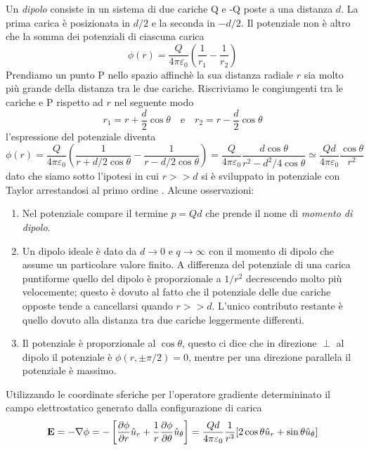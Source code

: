 Un \textit{dipolo} consiste in un sistema di due cariche Q e -Q poste a una distanza $d$. La prima carica \`e posizionata in $d/2$ e la seconda in $-d/2$. Il potenziale non \`e altro che la somma dei potenziali di ciascuna carica
\begin{equation*}
	\phi(r) = \frac{Q}{4 \pi \varepsilon_0} \left( \frac{1}{r_1} - \frac{1}{r_2}\right)
\end{equation*}
Prendiamo un punto P nello spazio  affinch\`e la sua distanza radiale $r$ sia molto pi\`u grande della distanza tra le due cariche. Riscriviamo le congiungenti tra le cariche e P rispetto ad $r$ nel seguente modo
\begin{equation*}
	r_1 = r + \frac{d}{2}\cos\theta \quad \text{e} \quad
	r_2 = r - \frac{d}{2}\cos \theta 
\end{equation*} 
l'espressione del potenziale diventa 
\begin{equation*}
	\phi(r) = \frac{Q}{4 \pi \varepsilon_0} \left(\frac{1}{r + d/2 \cos\theta } - \frac{1}{r - d/2 \cos\theta} \right) = \frac{Q}{4 \pi \varepsilon_0} \frac{d \cos \theta }{r^2 - d^2/4\cos \theta}\simeq \frac{Qd}{4 \pi \varepsilon_0} \frac{ \cos \theta }{r^2}
\end{equation*}
dato che siamo sotto l'ipotesi in cui $r >> d$ si \`e sviluppato in potenziale con Taylor arrestandosi al primo ordine .
Alcune osservazioni:
\begin{enumerate}

\item Nel potenziale compare il termine $ p=Qd$ che prende il nome di \textit{momento di dipolo}.

\item Un dipolo ideale \`e dato da $d \to 0$ e $q \to \infty $ con il momento di dipolo che assume un particolare valore finito. A differenza del potenziale di una carica puntiforme quello del dipolo \`e proporzionale a $1/r^2$ decrescendo molto pi\`u velocemente; questo \`e dovuto al fatto che il potenziale delle due cariche opposte tende a cancellarsi quando $r >> d$. L'unico contributo restante \`e quello dovuto alla distanza tra due cariche leggermente differenti.
\item Il potenziale \`e proporzionale al $\cos \theta $, questo ci dice che in direzione $\perp$ al dipolo il potenziale \`e $\phi(r,\pm \pi/2) = 0$, mentre per una direzione parallela il potenziale \`e massimo.

\end{enumerate}

Utilizzando le coordinate sferiche per l'operatore gradiente determininato il campo elettrostatico generato dalla configurazione di carica
\begin{equation*}
	\bold{E} = -\nabla \phi = - \left [ \frac{\partial \phi }{\partial r}\hat{u}_r + \frac{1}{r} \frac{\partial \phi}{\partial \theta}\hat{u}_{\theta} \right ] = \frac{Qd}{4 \pi \varepsilon_0}\frac{1}{r^3} [2 \cos \theta \hat{u}_{r} + \sin\theta \hat{u}_{\theta}]
\end{equation*}

